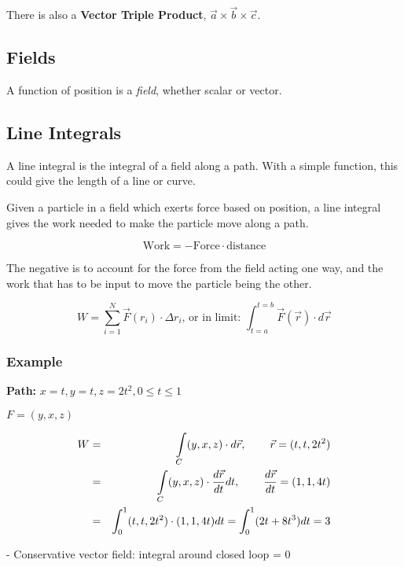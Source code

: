 There is also a {\bf Vector Triple Product},
${\vec a} \times {\vec b} \times {\vec c}$.

\subsection{Fields}

A function of position is a {\em field}, whether scalar or vector. 

\subsection{Line Integrals}

A line integral is the integral of a field along a path. With a simple
function, this could give the length of a line or curve. 

Given a particle in a field which exerts force based on position, a
line integral gives the work needed to make the particle move along a
path.

$$ \text{Work} = - \text{Force} \cdot \text{distance} $$

The negative is to account for the force from the field acting one
way, and the work that has to be input to move the particle being the
other.

\[
W = \displaystyle\sum\limits_{i=1}^N{\vec F}(r_i) \cdot \Delta r_i
\text{, or in limit: }
\int_{t=a}^{t=b}{\vec F}({\vec r}) \cdot d{\vec r}
\]

\subsubsection{Example}

{\bf Path:} $ x = t, y = t, z = 2t^2, 0 \leq t \leq 1 $

 $ F = (y, x, z) $

\begin{eqnarray*}
W
&=& \int\limits_C (y, x, z) \cdot d{\vec r},\hspace{5ex} {\vec r} = (t, t, 2t^2)
\\
&=& \int\limits_C (y, x, z) \cdot \frac{d{\vec r}}{dt}dt,\hspace{5ex}
\frac{d{\vec r}}{dt} = (1, 1, 4t) \\
&=& \int_0^1(t, t, 2t^2) \cdot (1, 1, 4t) dt = \int_0^1(2t + 8t^3)dt
= 3
\end{eqnarray*}


- Conservative vector field: integral around closed loop = 0

